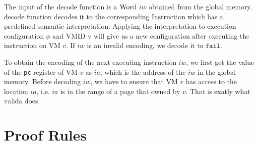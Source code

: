 \documentclass[a4paper]{article} \usepackage[a4paper]{geometry}
\newcommand*{\VMID}{\text{VMID}} \newcommand*{\REGNAMES}{\text{RegisterName}}
\newcommand*{\INSTR}{\text{Instruction}}
\newcommand*{\decode}{\text{decode}} \newcommand*{\valida}{\text{valida}}
\begin{document}


The input of the $\decode$ function is a $\text{Word}$ $iw$ obtained from the global
memory. $\decode$ function decodes it to the corresponding $\INSTR$ which has a
predefined semantic interpretation. Applying the interpretation to execution
configuration $\phi$ and $\VMID$ v will give us a new configuration after
executing the instruction on VM $v$. If $iw$ is an invalid encoding, we decode
it to $\mathtt{fail}$.

To obtain the encoding of the next executing instruction $iw$, we first get the
value of the \texttt{pc} register of VM $v$ as $ia$, which is the address of the
$iw$ in the global memory. Before decoding $iw$, we have to ensure that VM $v$
has access to the location $ia$, i.e. $ia$ is in the range of a page that owned
by $v$. That is exatly what $\valida$ does.

\section{Proof Rules}
\end{document}
